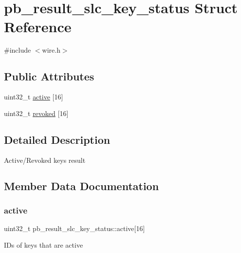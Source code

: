 \hypertarget{structpb__result__slc__key__status}{}\section{pb\+\_\+result\+\_\+slc\+\_\+key\+\_\+status Struct Reference}
\label{structpb__result__slc__key__status}


{\ttfamily \#include $<$wire.\+h$>$}

\subsection*{Public Attributes}
\begin{DoxyCompactItemize}
\item 
uint32\+\_\+t \hyperlink{structpb__result__slc__key__status_ac27f9285a325e804ac4ce52c06383065}{active} \mbox{[}16\mbox{]}
\item 
uint32\+\_\+t \hyperlink{structpb__result__slc__key__status_ac805564d0f28d72ce1df05e57be1d7d9}{revoked} \mbox{[}16\mbox{]}
\end{DoxyCompactItemize}


\subsection{Detailed Description}
Active/\+Revoked keys result 

\subsection{Member Data Documentation}
\mbox{\label{structpb__result__slc__key__status_ac27f9285a325e804ac4ce52c06383065}} 
\subsubsection{\texorpdfstring{active}{active}}
{\footnotesize\ttfamily uint32\+\_\+t pb\+\_\+result\+\_\+slc\+\_\+key\+\_\+status\+::active\mbox{[}16\mbox{]}}

ID\textquotesingle{}s of keys that are active \mbox{\label{structpb__result__slc__key__status_ac805564d0f28d72ce1df05e57be1d7d9}} 
